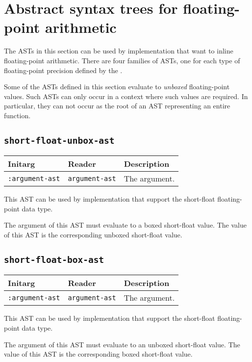 \section{Abstract syntax trees for floating-point arithmetic}
\label{sec-ast-floating-point-arithmetic}

The ASTs in this section can be used by implementation that want to
inline floating-point arithmetic.  There are four families of ASTs,
one for each type of floating-point precision defined by the \hs{}.

Some of the ASTs defined in this section evaluate to \emph{unboxed}
floating-point values.  Such ASTs can only occur in a context where
such values are required.  In particular, they can not occur as the
root of an AST representing an entire function.  

\subsection{\texttt{short-float-unbox-ast}}
\label{sec-ast-short-float-unbox}

\begin{tabular}{|l|l|l|}
\hline
Initarg & Reader & Description\\
\hline\hline
\texttt{:argument-ast} & \texttt{argument-ast} & The argument.\\
\hline
\end{tabular}

This AST can be used by implementation that support the short-float
floating-point data type.  

The argument of this AST must evaluate to a boxed short-float value.
The value of this AST is the corresponding unboxed short-float value.

\subsection{\texttt{short-float-box-ast}}
\label{sec-ast-short-float-box}

\begin{tabular}{|l|l|l|}
\hline
Initarg & Reader & Description\\
\hline\hline
\texttt{:argument-ast} & \texttt{argument-ast} & The argument.\\
\hline
\end{tabular}

This AST can be used by implementation that support the short-float
floating-point data type.  

The argument of this AST must evaluate to an unboxed short-float
value.  The value of this AST is the corresponding boxed short-float
value.

